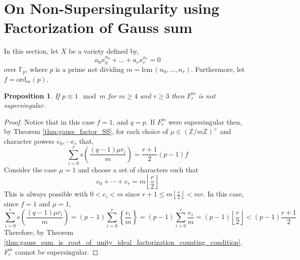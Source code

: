 \documentclass{article}
\newcommand{\Z}{\mathbb{Z}}
\newcommand{\F}{\mathbb{F}}
\newcommand{\lcm}[0]{\mathrm{lcm} \,}
\newtheorem{proposition}[theorem]{Proposition}
\theoremstyle{definition}
\theoremstyle{definition}
\theoremstyle{remark}
\begin{document}
\section{On Non-Supersingularity using Factorization of Gauss sum}
In this section, let $X$ be a variety defined by,
 \[ a_0 x_0^{n_0} + \dots + a_r x_r^{n_r} = 0 \]
  over $\F_p$, where $p$ is a prime not dividing $m =  \lcm(n_0, \dots, n_r)$. Furthermore, let $f = \text{ord}_m(p)$.
\begin{proposition}
If $p \equiv 1 \mod m$ for $m \ge 4$ and $r \ge 3$ then $F^m_r$ is not supersingular.
\end{proposition}
\begin{proof}
Notice that in this case $f = 1$, and $q = p$.  If $F^m_r$ were supersingular then,  by Theorem \ref{thm:gauss_factor_SS}, for each choice of $\mu \in (\Z / m \Z)^\times$ and character powers $e_0, \cdots e_r$ that,
\[\sum_{i = 0}^{r} s \left(\frac{(q-1)\mu r_i}{m} \right) = \frac{r+1}{2} (p-1) f \] 
Consider the case $\mu = 1$ and choose a set of characters such that \[e_0 + \cdots + e_r = m \left \lfloor  \frac{r}{2} \right \rfloor\]
This is always possible with $0 < e_i < m$ since $r+1 \le m \left \lfloor  \frac{r}{2} \right \rfloor < mr$. In this case, since $f = 1$ and $\mu = 1$,
\[ \sum_{i = 0}^{r} s \left(\frac{(q-1)\mu r_i}{m} \right) = (p-1)\sum_{i = 0}^{r} \left\{ \frac{e_i}{m} \right\} = (p - 1) \sum_{i = 0}^r \frac{e_i}{m} = (p - 1) \left \lfloor  \frac{r}{2} \right \rfloor < (p-1) \frac{r+1}{2} \]
Therefore, by Theorem \ref{thm:gauss_sum_is_root_of_unity_ideal_factorization_counting_condition}, $F^m_r$ cannot be supersingular. 
\end{proof}
\end{document}
